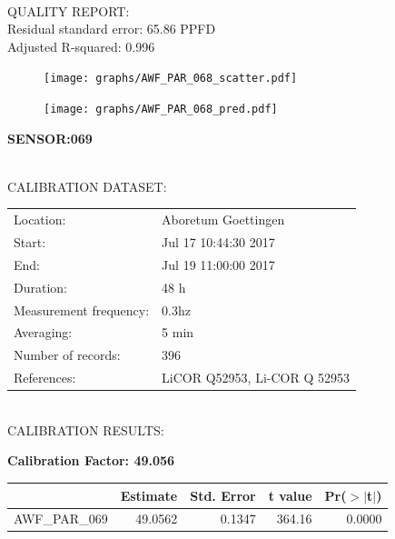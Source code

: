 \documentclass[oneside]{report}
\begin{document}
\hrulefill\\
QUALITY REPORT:\\
Residual standard error: 65.86 PPFD\\
Adjusted R-squared: 0.996



\begin{figure}[H]
  \centering
  \texttt{[image: graphs/AWF\_PAR\_068\_scatter.pdf]}
\end{figure}




\begin{figure}[H]
  \centering
  \texttt{[image: graphs/AWF\_PAR\_068\_pred.pdf]}
\end{figure}

\pagebreak


\begin{center}
\large{\textbf{SENSOR:069}}\\
\end{center}

\hrulefill\\
CALIBRATION DATASET:\\
\begin{table}[h!]
  \centering
  \label{tab:table1}
  \begin{tabular}{ll}
    Location: & Aboretum Goettingen\\ 
    
    
    Start:  & Jul 17 10:44:30 2017 \\
    End:   & Jul 19 11:00:00 2017\\ 
    Duration: & 48 h\\
    Measurement frequency: & 0.3hz\\
    Averaging:  &5 min\\
    Number of records: & 396 \\
    References: & LiCOR Q52953, Li-COR Q 52953 \\
  \end{tabular}
\end{table}

\hrulefill\\
CALIBRATION RESULTS:\\


\begin{center}
\textbf{\large{Calibration Factor: 49.056}}\\
\end{center}
\begin{table}[ht]
\centering
\begin{tabular}{rrrrr}
  \hline
 & Estimate & Std. Error & t value & Pr($>$$|$t$|$) \\ 
  \hline
AWF\_PAR\_069 & 49.0562 & 0.1347 & 364.16 & 0.0000 \\ 
   \hline
\end{tabular}
\end{table}
\end{document}
